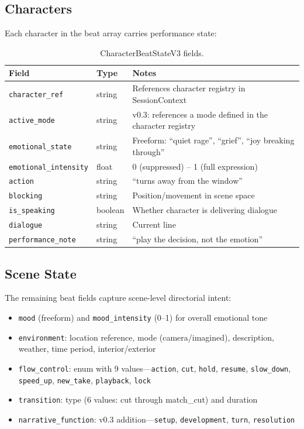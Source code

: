 \documentclass{article}
\begin{document}
\subsection{Characters}

Each character in the beat array carries performance state:

\begin{table}[H]
\centering
\begin{tabular}{@{}llp{7cm}@{}}
\toprule
\textbf{Field} & \textbf{Type} & \textbf{Notes} \\
\midrule
\texttt{character\_ref} & string & References character registry in SessionContext \\
\texttt{active\_mode} & string & v0.3: references a mode defined in the character registry \\
\texttt{emotional\_state} & string & Freeform: ``quiet rage'', ``grief'', ``joy breaking through'' \\
\texttt{emotional\_intensity} & float & 0 (suppressed) -- 1 (full expression) \\
\texttt{action} & string & ``turns away from the window'' \\
\texttt{blocking} & string & Position/movement in scene space \\
\texttt{is\_speaking} & boolean & Whether character is delivering dialogue \\
\texttt{dialogue} & string & Current line \\
\texttt{performance\_note} & string & ``play the decision, not the emotion'' \\
\bottomrule
\end{tabular}
\caption{CharacterBeatStateV3 fields.}
\label{tab:character}
\end{table}

\subsection{Scene State}

The remaining beat fields capture scene-level directorial intent:

\begin{itemize}\tightlist
  \item \texttt{mood} (freeform) and \texttt{mood\_intensity} (0--1) for overall emotional tone
  \item \texttt{environment}: location reference, mode (camera/imagined), description, weather, time period, interior/exterior
  \item \texttt{flow\_control}: enum with 9 values---\texttt{action}, \texttt{cut}, \texttt{hold}, \texttt{resume}, \texttt{slow\_down}, \texttt{speed\_up}, \texttt{new\_take}, \texttt{playback}, \texttt{lock}
  \item \texttt{transition}: type (6 values: cut through match\_cut) and duration
  \item \texttt{narrative\_function}: v0.3 addition---\texttt{setup}, \texttt{development}, \texttt{turn}, \texttt{resolution}
\end{itemize}
\end{document}
